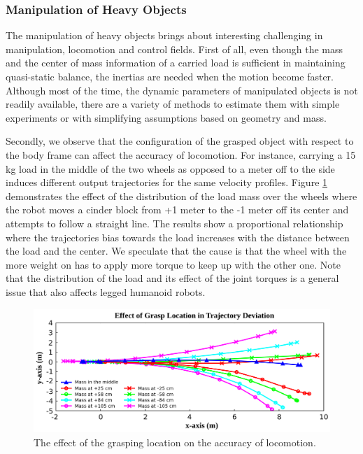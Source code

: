 \documentclass[runningheads,a4paper]{llncs}
\begin{document}
\subsubsection{Manipulation of Heavy Objects}

The manipulation of heavy objects brings about interesting challenging in manipulation, locomotion
and control fields. First of all, even though the mass and the center of mass information of a
carried load is sufficient in maintaining quasi-static balance, the inertias are needed when
the motion become faster. Although most of the time, the dynamic parameters of manipulated objects
is not readily available, there are a variety of methods to estimate them with simple experiments
\cite{saal2010active} or with simplifying assumptions based on geometry and mass. 

Secondly, we observe that the configuration of the grasped object with respect to the body frame
can affect the accuracy of locomotion. For instance, carrying a 15 kg load in the middle of the 
two wheels as opposed to a meter off to the side induces different output trajectories for the 
same velocity profiles. Figure \ref{fig:wheels} demonstrates the effect of the distribution 
of the load mass over the wheels where the robot moves a cinder block from +1 meter to the -1 meter off
its center and attempts to follow a straight line. The results show a proportional relationship
where the trajectories bias towards the load increases with the distance between the load and the center. 
We speculate that the cause is that the wheel with the more weight on has to apply more torque
to keep up with the other one. Note that the distribution of the load and its effect of the joint
torques is a general issue that also affects legged humanoid robots. 

\begin{figure}[ht!] 
  \centering
  \includegraphics[width=0.9\linewidth]{Figures/wheels.png}
  \caption{The effect of the grasping location on the accuracy of locomotion.}
  \label{fig:wheels}
\end{figure}
\end{document}
